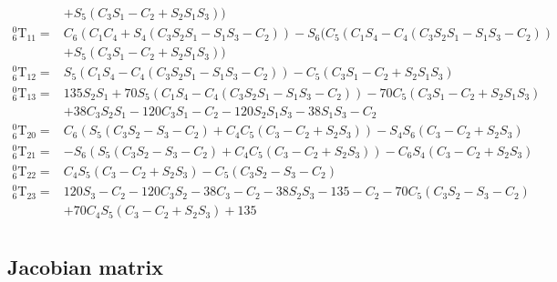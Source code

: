 \documentclass[12pt]{article}
\begin{document}
\begin{CJK}{UTF8}{bsmi}
\begin{equation*}
\begin{split}
					& + S_5(C_3S_1-C_2 + S_2S_1S_3))\\
^0_6\text{T}_{11} = &C_6(C_1C_4 + S_4(C_3S_2S_1 - S_1S_3-C_2)) - S_6(C_5(C_1S_4 - C_4(C_3S_2S_1 - S_1S_3-C_2))\\
					& + S_5(C_3S_1-C_2 + S_2S_1S_3))\\
^0_6\text{T}_{12} = &S_5(C_1S_4 - C_4(C_3S_2S_1 - S_1S_3-C_2)) - C_5(C_3S_1-C_2 + S_2S_1S_3)\\
^0_6\text{T}_{13} = &135S_2S_1 + 70S_5(C_1S_4 - C_4(C_3S_2S_1 - S_1S_3-C_2)) - 70C_5(C_3S_1-C_2 + S_2S_1S_3)\\
					& + 38C_3S_2S_1 - 120C_3S_1-C_2 - 120S_2S_1S_3 - 38S_1S_3-C_2\\
^0_6\text{T}_{20} = &C_6(S_5(C_3S_2 - S_3-C_2) + C_4C_5(C_3-C_2 + S_2S_3)) - S_4S_6(C_3-C_2 + S_2S_3)\\
^0_6\text{T}_{21} = &- S_6(S_5(C_3S_2 - S_3-C_2) + C_4C_5(C_3-C_2 + S_2S_3)) - C_6S_4(C_3-C_2 + S_2S_3)\\
^0_6\text{T}_{22} = &C_4S_5(C_3-C_2 + S_2S_3) - C_5(C_3S_2 - S_3-C_2)\\
^0_6\text{T}_{23} = &120S_3-C_2 - 120C_3S_2 - 38C_3-C_2 - 38S_2S_3 - 135-C_2 - 70C_5(C_3S_2 - S_3-C_2)\\
					& + 70C_4S_5(C_3-C_2 + S_2S_3) + 135\\
\end{split}
\end{equation*}
\subsection{Jacobian matrix}\label{appendix:jacobian}


\end{CJK}
\end{document}

